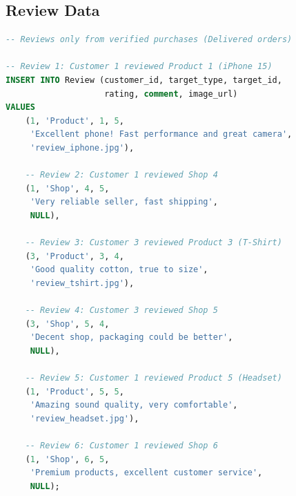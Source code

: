 \subsection{Review Data}

\begin{lstlisting}[language=SQL, caption=Sample REVIEW Insert, label=lst:insert_review]
-- Reviews only from verified purchases (Delivered orders)

-- Review 1: Customer 1 reviewed Product 1 (iPhone 15)
INSERT INTO Review (customer_id, target_type, target_id, 
                    rating, comment, image_url)
VALUES
    (1, 'Product', 1, 5,
     'Excellent phone! Fast performance and great camera',
     'review_iphone.jpg'),
    
    -- Review 2: Customer 1 reviewed Shop 4
    (1, 'Shop', 4, 5,
     'Very reliable seller, fast shipping',
     NULL),
    
    -- Review 3: Customer 3 reviewed Product 3 (T-Shirt)
    (3, 'Product', 3, 4,
     'Good quality cotton, true to size',
     'review_tshirt.jpg'),
    
    -- Review 4: Customer 3 reviewed Shop 5
    (3, 'Shop', 5, 4,
     'Decent shop, packaging could be better',
     NULL),
    
    -- Review 5: Customer 1 reviewed Product 5 (Headset)
    (1, 'Product', 5, 5,
     'Amazing sound quality, very comfortable',
     'review_headset.jpg'),
    
    -- Review 6: Customer 1 reviewed Shop 6
    (1, 'Shop', 6, 5,
     'Premium products, excellent customer service',
     NULL);
\end{lstlisting}